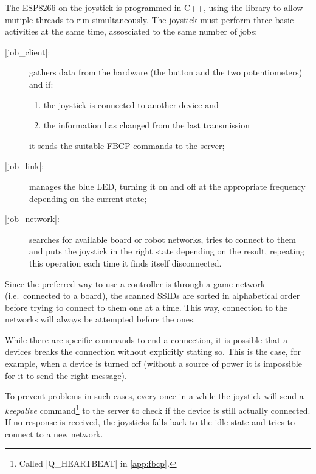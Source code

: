 \beforelist* The ESP8266 on the joystick is programmed in C++, using the
\ScheMo{} library to allow mutiple threads to run simultaneously.
The joystick must perform three basic activities at the same time, assosciated
to the same number of jobs:
\begin{description}
  \item[\Code|job\_client|:] gathers data from the hardware (the button and the
    two potentiometers) and if:
    \begin{enumerate}[itemjoin={,}, itemjoin*={{ and }}]
      \item the joystick is connected to another device and
      \item the information has changed from the last transmission
    \end{enumerate}
    it sends the suitable FBCP commands to the server;
  \item[\Code|job\_link|:] manages the blue LED, turning it on and off at the
    appropriate frequency depending on the current state;
  \item[\Code|job\_network|:] searches for available board or robot networks,
    tries to connect to them and puts the joystick in the right state
    depending on the result, repeating this operation each time it finds itself
    disconnected.
\end{description}
\afterlist*
Since the preferred way to use a controller is through a game network
(i.e.\ connected to a board), the scanned SSIDs are sorted in alphabetical
order before trying to connect to them one at a time.
This way, connection to the  networks will always
be attempted before the  ones.

While there are specific commands to end a connection, it is possible that
a devices breaks the connection without explicitly stating so.
This is the case, for example, when a device is turned off (without a source of
power it is impossible for it to send the right message).

To prevent problems in such cases, every once in a while the joystick will send
a \emph{keepalive} command\footnote{Called \Code|Q\_HEARTBEAT| in
\autoref{app:fbcp}.} to the server to check if the device is still actually
connected.
If no response is received, the joysticks falls back to the idle state and tries
to connect to a new network.
